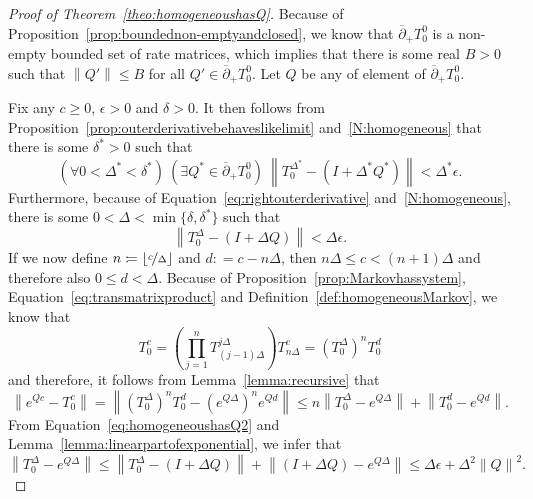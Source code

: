 \documentclass[10pt]{paper}
\theoremstyle{definition}
\newcommand{\norm}[1]{\left\lVert #1 \right\rVert}
\newcommand{\coloneqq}{:\!=}
\begin{document}
\begin{proof}[Proof of Theorem~\ref{theo:homogeneoushasQ}]
Because of Proposition~\ref{prop:boundednon-emptyandclosed}, we know that $\overline{\partial}_{+}
{T^0_{0}}$ is a non-empty bounded set of rate matrices, which implies that there is some real $B>0$ such that $\norm{Q'}\leq B$ for all $Q'\in\overline{\partial}_{+}
{T^0_{0}}$. Let $Q$ be any of element of $\overline{\partial}_{+}
{T^0_{0}}$.


Fix any $c\geq0$, $\epsilon>0$ and $\delta>0$. 
It then follows from Proposition~\ref{prop:outerderivativebehaveslikelimit} and~\ref{N:homogeneous} that there is some $\delta^*>0$ such that
\begin{equation}
\label{eq:homogeneoushasQ1}
(\forall 0<\Delta^*<\delta^*)
~
(\exists Q^*\in\overline{\partial}_{+}
{T^0_{0}})
~
\norm{T_0^{\Delta^*}-(I+\Delta^*Q^*)}<\Delta^*\epsilon.
\end{equation}
Furthermore, because of Equation~\eqref{eq:rightouterderivative} and~\ref{N:homogeneous}, there is some $0<\Delta<\min\{\delta,\delta^*\}$ such that
\begin{equation}
\label{eq:homogeneoushasQ2}
\norm{T^{\Delta}_{0}-(I+\Delta Q)}<\Delta\epsilon.
\end{equation}
If we now define $n\coloneqq\lfloor\nicefrac{c}{\Delta}\rfloor$ and $d\coloneqq c-n\Delta$, then $n\Delta\leq c<(n+1)\Delta$ and therefore also $0\leq d<\Delta$. Because of Proposition~\ref{prop:Markovhassystem}, Equation~\eqref{eq:transmatrixproduct} and Definition~\ref{def:homogeneousMarkov}, we know that
\begin{equation*}
T_0^c=\left(
\prod_{j=1}^{n}
T_{(j-1)\Delta}^{j\Delta}
\right)
T_{n\Delta}^c
=\left(T_0^{\Delta}\right)^{n}
T_0^{d}
\end{equation*}
and therefore, it follows from Lemma~\ref{lemma:recursive} that
\begin{equation}
\label{eq:homogeneoushasQ3}
\norm{
	e^{Qc}-T_0^c
}
=
\norm{
\left(T_0^{\Delta}\right)^{n}
T_0^{d}
-
\left(
e^{Q\Delta}
\right)^{n}
e^{Qd}
}
\leq
n\norm{T_0^{\Delta}-e^{Q\Delta}}
+\norm{T_0^{d}-e^{Qd}}.
\end{equation}
From Equation~\eqref{eq:homogeneoushasQ2} and Lemma~\ref{lemma:linearpartofexponential}, we infer that
\begin{equation}
\label{eq:homogeneoushasQ4}
\norm{T_0^{\Delta}-e^{Q\Delta}}
\leq
\norm{T_0^{\Delta}-(I+\Delta Q)}
+
\norm{(I+\Delta Q)-e^{Q\Delta}}
\leq
\Delta\epsilon
+
\Delta^2\norm{Q}^2.
\end{equation}

\end{proof}
\end{document}
